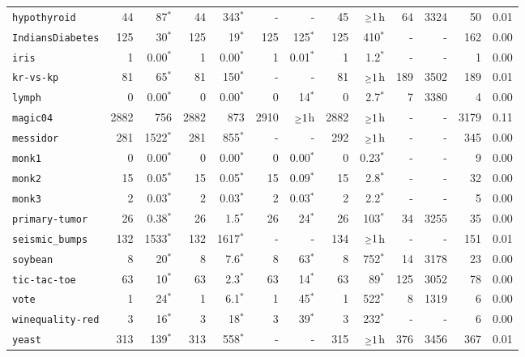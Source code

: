 \begin{tabular}{lrrrrrrrrrrrr}
\texttt{hypothyroid} & 44 & 87$^*$ & 44 & 343$^*$ & - & - & 45 & $\mathsmaller{\geq}1$h & 64 & 3324 & 50 & 0.01\\
\texttt{IndiansDiabetes} & 125 & 30$^*$ & 125 & 19$^*$ & 125 & 125$^*$ & 125 & 410$^*$ & - & - & 162 & 0.00\\
\texttt{iris} & 1 & 0.00$^*$ & 1 & 0.00$^*$ & 1 & 0.01$^*$ & 1 & 1.2$^*$ & - & - & 1 & 0.00\\
\texttt{kr-vs-kp} & 81 & 65$^*$ & 81 & 150$^*$ & - & - & 81 & $\mathsmaller{\geq}1$h & 189 & 3502 & 189 & 0.01\\
\texttt{lymph} & 0 & 0.00$^*$ & 0 & 0.00$^*$ & 0 & 14$^*$ & 0 & 2.7$^*$ & 7 & 3380 & 4 & 0.00\\
\texttt{magic04} & 2882 & 756 & 2882 & 873 & 2910 & $\mathsmaller{\geq}1$h & 2882 & $\mathsmaller{\geq}1$h & - & - & 3179 & 0.11\\
\texttt{messidor} & 281 & 1522$^*$ & 281 & 855$^*$ & - & - & 292 & $\mathsmaller{\geq}1$h & - & - & 345 & 0.00\\
\texttt{monk1} & 0 & 0.00$^*$ & 0 & 0.00$^*$ & 0 & 0.00$^*$ & 0 & 0.23$^*$ & - & - & 9 & 0.00\\
\texttt{monk2} & 15 & 0.05$^*$ & 15 & 0.05$^*$ & 15 & 0.09$^*$ & 15 & 2.8$^*$ & - & - & 32 & 0.00\\
\texttt{monk3} & 2 & 0.03$^*$ & 2 & 0.03$^*$ & 2 & 0.03$^*$ & 2 & 2.2$^*$ & - & - & 5 & 0.00\\
\texttt{primary-tumor} & 26 & 0.38$^*$ & 26 & 1.5$^*$ & 26 & 24$^*$ & 26 & 103$^*$ & 34 & 3255 & 35 & 0.00\\
\texttt{seismic\_bumps} & 132 & 1533$^*$ & 132 & 1617$^*$ & - & - & 134 & $\mathsmaller{\geq}1$h & - & - & 151 & 0.01\\
\texttt{soybean} & 8 & 20$^*$ & 8 & 7.6$^*$ & 8 & 63$^*$ & 8 & 752$^*$ & 14 & 3178 & 23 & 0.00\\
\texttt{tic-tac-toe} & 63 & 10$^*$ & 63 & 2.3$^*$ & 63 & 14$^*$ & 63 & 89$^*$ & 125 & 3052 & 78 & 0.00\\
\texttt{vote} & 1 & 24$^*$ & 1 & 6.1$^*$ & 1 & 45$^*$ & 1 & 522$^*$ & 8 & 1319 & 6 & 0.00\\
\texttt{winequality-red} & 3 & 16$^*$ & 3 & 18$^*$ & 3 & 39$^*$ & 3 & 232$^*$ & - & - & 6 & 0.00\\
\texttt{yeast} & 313 & 139$^*$ & 313 & 558$^*$ & - & - & 315 & $\mathsmaller{\geq}1$h & 376 & 3456 & 367 & 0.01\\
\bottomrule
\end{tabular}
